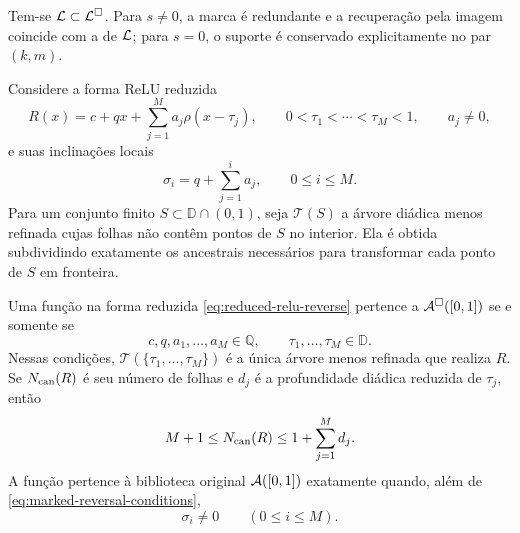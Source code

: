 Tem-se $\mathcal{L}\subset\mathcal{L}^\square$. Para $s\ne0$, a marca é redundante
e a recuperação pela imagem coincide com a de $\mathcal{L}$; para $s=0$, o
suporte é conservado explicitamente no par $(k,m)$.

Considere a forma ReLU reduzida
\begin{equation}
 R(x)=c+qx+\sum_{j=1}^{M}a_j\rho(x-\tau_j),
 \qquad 0<\tau_1<\cdots<\tau_M<1,
 \qquad a_j\ne0,
 \label{eq:reduced-relu-reverse}
\end{equation}
e suas inclinações locais
\begin{equation}
 \sigma_i=q+\sum_{j=1}^{i}a_j,
 \qquad 0\le i\le M.
 \label{eq:reverse-local-slopes}
\end{equation}
Para um conjunto finito $S\subset\mathbb D\cap(0,1)$, seja
$\mathcal T(S)$ a árvore diádica menos refinada cujas folhas não contêm
pontos de $S$ no interior. Ela é obtida subdividindo exatamente os ancestrais
necessários para transformar cada ponto de $S$ em fronteira.

\begin{theorem}
\label{thm:exact-marked-reversal}
Uma função na forma reduzida \eqref{eq:reduced-relu-reverse} pertence a
$\mathcal{A}^\square([0,1])$ se e somente se
\begin{equation}
 c,q,a_1,\ldots,a_M\in\mathbb Q,
 \qquad
 \tau_1,\ldots,\tau_M\in\mathbb D.
 \label{eq:marked-reversal-conditions}
\end{equation}
Nessas condições, $\mathcal T(\{\tau_1,\ldots,\tau_M\})$ é a única árvore
menos refinada que realiza $R$. Se $N_{\rm can}(R)$ é seu número de folhas e
$d_j$ é a profundidade diádica reduzida de $\tau_j$, então
\begin{equation}
 M+1\le N_{\rm can}(R)
 \le 1+\sum_{j=1}^{M}d_j.
 \label{eq:canonical-tree-leaf-bounds}
\end{equation}
A função pertence à biblioteca original $\mathcal{A}([0,1])$ exatamente quando,
além de \eqref{eq:marked-reversal-conditions},
\begin{equation}
 \sigma_i\ne0\qquad(0\le i\le M).
 \label{eq:original-nonflat-condition}
\end{equation}
\end{theorem}

